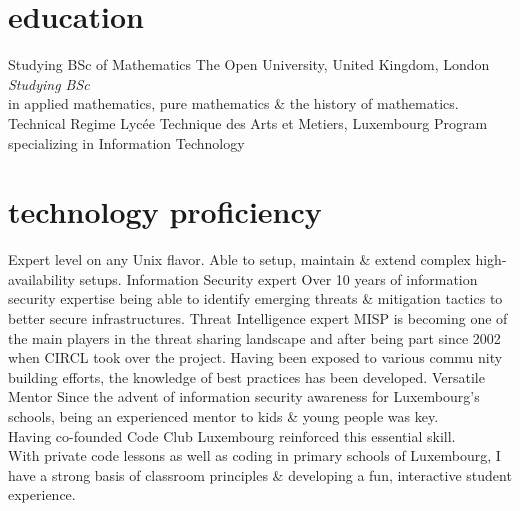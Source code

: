 \documentclass[a4paper]{friggeri-cv} %
\begin{document}
\newpage


\section{education}
\begin{entrylist}
{Studying BSc {\normalfont of Mathematics}}
{The Open University, United Kingdom, London}
{\emph{Studying BSc} \\ in applied mathematics, pure mathematics \& the history of mathematics.}
{Technical Regime}
{Lyc\'{e}e Technique des Arts et Metiers, Luxembourg}
{Program specializing in Information Technology}
\end{entrylist}


\section{technology proficiency}

\begin{entrylist}
{}
{Expert level on any Unix flavor. Able to setup, maintain \& extend complex high-availability setups.}
{Information Security expert}
{}
{Over 10 years of information security expertise being able to identify emerging threats \& mitigation tactics to better secure infrastructures.}
{Threat Intelligence expert}
{}
{MISP is becoming one of the main players in the threat sharing landscape and after being part since 2002 when CIRCL took over the project. Having been exposed to various commu
nity building efforts, the knowledge of best practices has been developed.}
{Versatile Mentor}
{}
{Since the advent of information security awareness for Luxembourg's schools, being an experienced mentor to kids \& young people was key. \\
Having co-founded Code Club Luxembourg reinforced this essential skill. \\
With private code lessons as well as coding in primary schools of Luxembourg, I have a strong basis of classroom principles \& developing a fun, interactive student experience.}
\end{entrylist}
\end{document}
